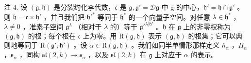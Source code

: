 注 4. 设 \((\mathfrak{g},\mathfrak{h})\) 是分裂约化李代数，\(\mathfrak{c}\) 是 \(\mathfrak{g},\mathfrak{g}' = \mathcal{D}\mathfrak{g}\) 中 g 的中心，\(\mathfrak{h}' = \mathfrak{h} \cap \mathfrak{g}'\) 。则 \(\mathfrak{h} = \mathfrak{c} \times \mathfrak{h}'\) ，并且我们把 \(\mathfrak{h}'^*\) 等同于 \(\mathfrak{h}^*\) 的一个向量子空间。对任意 \(\lambda \in \mathfrak{h}^*\) ，\(\lambda \neq 0\) ，准素子空间 \(\mathfrak{g}^\lambda\) （相对于 \(\lambda\) 的）等于 \(\mathfrak{g}'^{\lambda | \mathfrak{h}'}\) 。\(\mathfrak{h}\) 在 \(\mathfrak{g}\) 上的非零权称为 \((\mathfrak{g},\mathfrak{h})\) 的根；每个根在 \(\mathfrak{c}\) 上为零。用 \(\mathrm{R}(\mathfrak{g},\mathfrak{h})\) 表示 \((\mathfrak{g},\mathfrak{h})\) 的根集；它可以典则地等同于 \(\mathrm{R}(\mathfrak{g}',\mathfrak{h}')\) 。设 \(\alpha \in \mathrm{R}(\mathfrak{g},\mathfrak{h})\) 。我们如同半单情形那样定义 \(h_\alpha\) ，\(H_\alpha\) ，\(\mathfrak{s}_\alpha\) ，同构 \(\mathfrak{sl}(2,k) \to \mathfrak{s}_\alpha\) ，以及 \(\mathfrak{sl}(2,k)\) 在 \(\mathfrak{g}\) 上对应于 \(\alpha\) 的表示。

